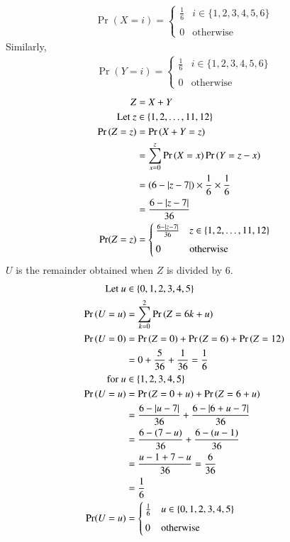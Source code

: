 \documentclass[journal,12pt,twocolumn]{IEEEtran}
\begin{document}
\begin{align}
    \Pr(X=i) = 
	\begin{cases}
	\frac{1}{6}   &  i \in \{1, 2, 3, 4, 5, 6\}\\ ~\\[-1em]
	0 & \text{otherwise}
	\end{cases}
\end{align}
Similarly, 
\begin{align}
    \Pr(Y=i) = 
	\begin{cases}
	\frac{1}{6}   &  i \in \{1, 2, 3, 4, 5, 6\}\\ ~\\[-1em]
	0 & \text{otherwise}
	\end{cases}
\end{align}
\begin{align}
    Z &= X+Y
    \\ \text{Let } z &\in \{1, 2, \hdots, 11, 12\}
    \\\Pr{(Z=z)} &= \Pr{(X+Y = z)}
    \\ &= \sum_{x=0}^z \Pr{(X=x)}\Pr{(Y=z-x)}
    \\ &= (6 - \vert z-7\vert) \times\frac{1}{6}\times\frac{1}{6}
    \\ &= \frac{6 - \vert z-7\vert}{36}
    \\\Pr(Z=z) &= 
	\begin{cases}
	\frac{6 - \vert z-7\vert}{36}   &  z \in \{1, 2, \hdots, 11, 12\}\\ ~\\[-1em]
	0 & \text{otherwise}
	\end{cases}
\end{align}
$U$ is the remainder obtained when $Z$ is divided by 6.
\begin{align}
    \text{Let } u &\in \{0, 1, 2, 3, 4, 5\}
    \\\Pr{(U=u)} &= \sum_{k=0}^2\Pr{(Z = 6k+u)}
    \\\Pr{(U=0)} &= \Pr{(Z = 0)} + \Pr{(Z = 6)} + \Pr{(Z = 12)}
    \\ &= 0 + \frac{5}{36} + \frac{1}{36} = \frac{1}{6}
    \\ \text{for } u &\in \{1, 2, 3, 4, 5\}
    \\\Pr{(U=u)} &= \Pr{(Z = 0+u)} + \Pr{(Z = 6+u)}
    \\&= \frac{6 - \vert u-7\vert}{36} +  \frac{6 - \vert6+u-7\vert}{36}
    \\&= \frac{6 - (7-u)}{36} +  \frac{6 - (u-1)}{36}
    \\&= \frac{u - 1 + 7 - u}{36} = \frac{6}{36}
    \\&=\frac{1}{6}
    \\\Pr(U=u) &= 
	\begin{cases}
    \frac{1}{6}   &  u \in \{0, 1, 2, 3, 4, 5\}\\ ~\\[-1em]
	0 & \text{otherwise}
	\end{cases}
\end{align}
\end{document}

